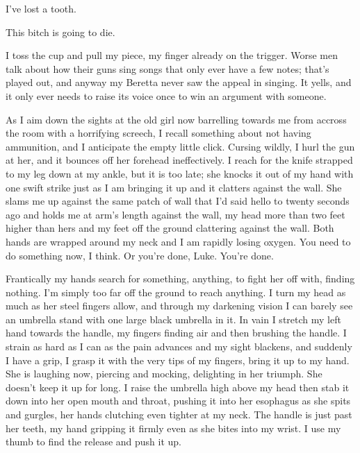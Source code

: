 I've lost a tooth.



This bitch is going to die.



I toss the cup and pull my piece, my finger already on the trigger.
Worse men talk about how their guns sing songs that only ever have
a few notes; that's played out, and anyway my Beretta never saw the
appeal in singing. It yells, and it only ever needs to raise its
voice once to win an argument with someone.



As I aim down the sights at the old girl now barrelling towards me
from accross the room with a horrifying screech, I recall something
about not having ammunition, and I anticipate the empty little
click. Cursing wildly, I hurl the gun at her, and it bounces off
her forehead ineffectively. I reach for the knife strapped to my
leg down at my ankle, but it is too late; she knocks it out of my
hand with one swift strike just as I am bringing it up and it
clatters against the wall. She slams me up against the same patch
of wall that I'd said hello to twenty seconds ago and holds me at
arm's length against the wall, my head more than two feet higher
than hers and my feet off the ground clattering against the wall.
Both hands are wrapped around my neck and I am rapidly losing
oxygen. You need to do something now, I think. Or you're done,
Luke. You're done.



Frantically my hands search for something, anything, to fight her
off with, finding nothing. I'm simply too far off the ground to
reach anything. I turn my head as much as her steel fingers allow,
and through my darkening vision I can barely see an umbrella stand
with one large black umbrella in it. In vain I stretch my left hand
towards the handle, my fingers finding air and then brushing the
handle. I strain as hard as I can as the pain advances and my sight
blackens, and suddenly I have a grip, I grasp it with the very tips
of my fingers, bring it up to my hand. She is laughing now,
piercing and mocking, delighting in her triumph. She doesn't keep
it up for long. I raise the umbrella high above my head then stab
it down into her open mouth and throat, pushing it into her
esophagus as she spits and gurgles, her hands clutching even
tighter at my neck. The handle is just past her teeth, my hand
gripping it firmly even as she bites into my wrist. I use my thumb
to find the release and push it up.




